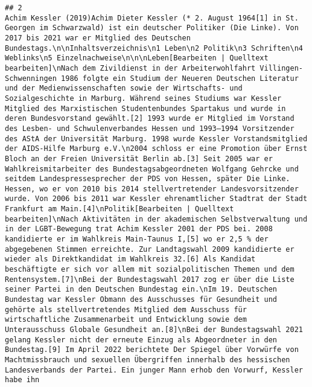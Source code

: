 \documentclass[
]{article}
\begin{document}
\begin{verbatim}
## 2                                                                                                                                                                                                                                                                                                                                                                                                                                                                                                                                                                                                                                                                                                                                                                                                                                                                                                                                                                                           Achim Kessler (2019)Achim Dieter Kessler (* 2. August 1964[1] in St. Georgen im Schwarzwald) ist ein deutscher Politiker (Die Linke). Von 2017 bis 2021 war er Mitglied des Deutschen Bundestags.\n\nInhaltsverzeichnis\n1 Leben\n2 Politik\n3 Schriften\n4 Weblinks\n5 Einzelnachweise\n\n\nLeben[Bearbeiten | Quelltext bearbeiten]\nNach dem Zivildienst in der Arbeiterwohlfahrt Villingen-Schwenningen 1986 folgte ein Studium der Neueren Deutschen Literatur und der Medienwissenschaften sowie der Wirtschafts- und Sozialgeschichte in Marburg. Während seines Studiums war Kessler Mitglied des Marxistischen Studentenbundes Spartakus und wurde in deren Bundesvorstand gewählt.[2] 1993 wurde er Mitglied im Vorstand des Lesben- und Schwulenverbandes Hessen und 1993–1994 Vorsitzender des AStA der Universität Marburg. 1998 wurde Kessler Vorstandsmitglied der AIDS-Hilfe Marburg e.V.\n2004 schloss er eine Promotion über Ernst Bloch an der Freien Universität Berlin ab.[3] Seit 2005 war er Wahlkreismitarbeiter des Bundestagsabgeordneten Wolfgang Gehrcke und seitdem Landespressesprecher der PDS von Hessen, später Die Linke. Hessen, wo er von 2010 bis 2014 stellvertretender Landesvorsitzender wurde. Von 2006 bis 2011 war Kessler ehrenamtlicher Stadtrat der Stadt Frankfurt am Main.[4]\nPolitik[Bearbeiten | Quelltext bearbeiten]\nNach Aktivitäten in der akademischen Selbstverwaltung und in der LGBT-Bewegung trat Achim Kessler 2001 der PDS bei. 2008 kandidierte er im Wahlkreis Main-Taunus I,[5] wo er 2,5 % der abgegebenen Stimmen erreichte. Zur Landtagswahl 2009 kandidierte er wieder als Direktkandidat im Wahlkreis 32.[6] Als Kandidat beschäftigte er sich vor allem mit sozialpolitischen Themen und dem Rentensystem.[7]\nBei der Bundestagswahl 2017 zog er über die Liste seiner Partei in den Deutschen Bundestag ein.\nIm 19. Deutschen Bundestag war Kessler Obmann des Ausschusses für Gesundheit und gehörte als stellvertretendes Mitglied dem Ausschuss für wirtschaftliche Zusammenarbeit und Entwicklung sowie dem Unterausschuss Globale Gesundheit an.[8]\nBei der Bundestagswahl 2021 gelang Kessler nicht der erneute Einzug als Abgeordneter in den Bundestag.[9] Im April 2022 berichtete Der Spiegel über Vorwürfe von Machtmissbrauch und sexuellen Übergriffen innerhalb des hessischen Landesverbands der Partei. Ein junger Mann erhob den Vorwurf, Kessler habe ihn 
\end{verbatim}
\end{document}
